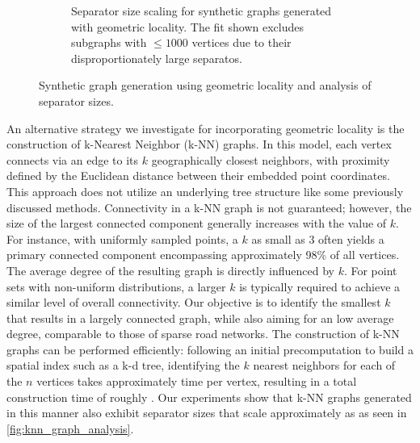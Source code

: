\begin{figure}[tbhp]
\begin{subfigure}{0.55\linewidth}
		\caption{Separator size scaling for synthetic graphs generated with geometric locality. The fit shown excludes subgraphs with \( \le 1000 \) vertices due to their disproportionately large separatos. }
		\label{fig:geometric_locality_sep_plot}
	\end{subfigure}
	\caption{Synthetic graph generation using geometric locality and analysis of separator sizes. }
	\label{fig:geometric_locality_separators}
\end{figure}

An alternative strategy we investigate for incorporating geometric locality is the construction of k-Nearest Neighbor (k-NN) graphs.
In this model, each vertex connects via an edge to its \(k\) geographically closest neighbors, with proximity defined by the Euclidean distance between their embedded point coordinates.
This approach does not utilize an underlying tree structure like some previously discussed methods.
Connectivity in a k-NN graph is not guaranteed; however, the size of the largest connected component generally increases with the value of \(k\).
For instance, with uniformly sampled points, a \(k\) as small as 3 often yields a primary connected component encompassing approximately 98\% of all vertices.
The average degree of the resulting graph is directly influenced by \(k\).
For point sets with non-uniform distributions, a larger \(k\) is typically required to achieve a similar level of overall connectivity.
Our objective is to identify the smallest \(k\) that results in a largely connected graph, while also aiming for an low average degree, comparable to those of sparse road networks.
The construction of k-NN graphs can be performed efficiently: following an initial  precomputation to build a spatial index such as a k-d tree, identifying the \(k\) nearest neighbors for each of the \(n\) vertices takes approximately  time per vertex, resulting in a total construction time of roughly .
Our experiments show that k-NN graphs generated in this manner also exhibit separator sizes that scale approximately as  as seen in \cref{fig:knn_graph_analysis}.

